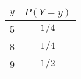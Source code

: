 \begin{tabular}{|c|c|}
\hline
 $y$ & $P(Y=y)$     \\ \hline
5 & $1/4$ \\ \hline
8 & $1/4$ \\ \hline
9 & $1/2$ \\ \hline
\end{tabular}
